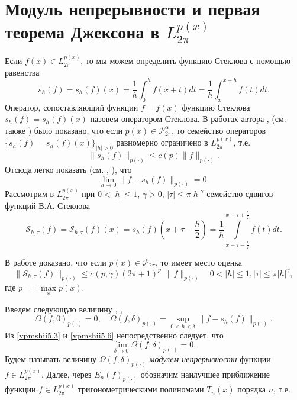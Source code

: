 \section{Модуль непрерывности и первая теорема Джексона в  $L_{2\pi}^{p(x)}$}\label{vpmshiis5}

Если $f(x)\in L_{2\pi}^{p(x)} $, то мы можем определить функцию Стеклова с помощью равенства
\begin{equation}\label{vpmshii4.1}
    s_h(f)=s_h(f)(x)=\frac1h\int_0^hf(x+t)dt=\frac1h\int_x^{x+h}f(t)dt.
\end{equation}
Оператор, сопоставляющий функции  $f=f(x)$ функцию Стеклова $s_h(f)=s_h(f)(x)$ назовем оператором Стеклова. В работах автора  \cite{vpmshiiShar5},
\cite{vpmshiiShar2} (см. также \cite{shiimonog}) было показано, что если $p(x)\in\mathcal{ P}^\alpha_{2\pi}$, то семейство операторов $\{s_h(f)=s_h(f)(x)\}_{|h|>0}$ равномерно ограничено в $ L_{2\pi}^{p(x)} $, т.е.
\begin{equation}\label{vpmshii5.2}
    \|s_h(f)\|_{p(\cdot)}\le c(p)\|f\|_{p(\cdot)}.
\end{equation}
Отсюда легко показать (см. \cite{vpmshiiShar5}, \cite{shiimonog}), что
\begin{equation}\label{vpmshii5.3}
    \lim_{h\to0}\|f-s_h(f)\|_{p(\cdot)}=0.
\end{equation}
Рассмотрим в $L^{p(x)}_{2\pi}$ при $0<|h|\le1$, $\gamma>0$, $|\tau|\le\pi |h|^\gamma$ семейство
сдвигов функций  В.А. Стеклова
\begin{equation}\label{vpmshii5.4}
   \mathcal{ S}_{h,\tau}(f)=\mathcal{
S}_{h,\tau}(f)(x)=s_h(f)(x+\tau-\frac{h}{2})=
\frac{1}{h}\int\limits_{x+\tau-\frac{h}{2}}^{x+\tau+\frac{h}{2}}f(t)dt.
\end{equation}

В работе \cite{vpmshiiShar2}  доказано, что если $p(x)\in \mathcal{ P}_{2\pi}$, то
имеет место оценка
\begin{equation}\label{vpmshii5.5}
 \|\mathcal{ S}_{h,\tau}(f)\|_{p(\cdot)}\le
c(p,\gamma)(2\pi+1)^{p^-}\|f\|_{p(\cdot)} \quad 0<|h|\le1, |\tau|\le\pi
|h|^\gamma,
\end{equation}
где $p^-=\max\limits_{x}p(x)$.

Введем следующую величину \cite{vpmshiiShar2}, \cite{shiimonog}, \cite{vpmshiiShar6}
\begin{equation}\label{vpmshii5.6}
    \Omega(f,0)_{p(\cdot)}=0,\quad \Omega(f,\delta)_{p(\cdot)}=\sup_{0<h<\delta}\|f-s_h(f)\|_{p(\cdot)}.
\end{equation}
Из \eqref{vpmshii5.3} и \eqref{vpmshii5.6} непосредственно следует, что
\begin{equation}\label{vpmshii5.7}
    \lim_{\delta\to0}\Omega(f,\delta)_{p(\cdot)}=0.
\end{equation}
Будем называть величину $\Omega(f,\delta)_{p(\cdot)}$ \textit{ модулем непрерывности} функции $f\in L_{2\pi}^{p(x)} $.
Далее, через $E_n(f)_{p(\cdot)}$  обозначим наилучшее приближение функции $f\in L_{2\pi}^{p(x)} $ тригонометрическими полиномами $T_n(x)$ порядка $n$, т.е.


